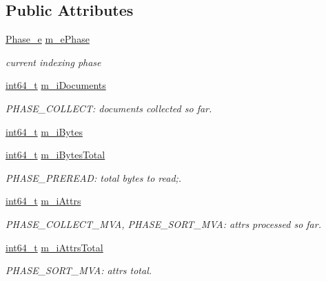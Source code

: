 \subsection*{Public Attributes}
\begin{DoxyCompactItemize}
\item 
\hyperlink{structCSphIndexProgress_a9cb9d88169df8a08b63f58ac952f97e2}{Phase\-\_\-e} \hyperlink{structCSphIndexProgress_acf27cb1ca0bc036494f1e798bdb97483}{m\-\_\-e\-Phase}
\begin{DoxyCompactList}\small\item\em current indexing phase \end{DoxyCompactList}\item 
\hyperlink{sphinxstd_8h_a996e72f71b11a5bb8b3b7b6936b1516d}{int64\-\_\-t} \hyperlink{structCSphIndexProgress_aa3fdf708687fd27e13bae4f384f605f0}{m\-\_\-i\-Documents}
\begin{DoxyCompactList}\small\item\em P\-H\-A\-S\-E\-\_\-\-C\-O\-L\-L\-E\-C\-T\-: documents collected so far. \end{DoxyCompactList}\item 
\hyperlink{sphinxstd_8h_a996e72f71b11a5bb8b3b7b6936b1516d}{int64\-\_\-t} \hyperlink{structCSphIndexProgress_a778f740e2ce2fa762b042bdb3ae06cbc}{m\-\_\-i\-Bytes}
\item 
\hyperlink{sphinxstd_8h_a996e72f71b11a5bb8b3b7b6936b1516d}{int64\-\_\-t} \hyperlink{structCSphIndexProgress_a3f89e51e9c2238eec970ba7de63ba33d}{m\-\_\-i\-Bytes\-Total}
\begin{DoxyCompactList}\small\item\em P\-H\-A\-S\-E\-\_\-\-P\-R\-E\-R\-E\-A\-D\-: total bytes to read;. \end{DoxyCompactList}\item 
\hyperlink{sphinxstd_8h_a996e72f71b11a5bb8b3b7b6936b1516d}{int64\-\_\-t} \hyperlink{structCSphIndexProgress_a0ece283c0e0643c6dbc9c16d27cd2b5d}{m\-\_\-i\-Attrs}
\begin{DoxyCompactList}\small\item\em P\-H\-A\-S\-E\-\_\-\-C\-O\-L\-L\-E\-C\-T\-\_\-\-M\-V\-A, P\-H\-A\-S\-E\-\_\-\-S\-O\-R\-T\-\_\-\-M\-V\-A\-: attrs processed so far. \end{DoxyCompactList}\item 
\hyperlink{sphinxstd_8h_a996e72f71b11a5bb8b3b7b6936b1516d}{int64\-\_\-t} \hyperlink{structCSphIndexProgress_a4669529ab4d9ae7ccae6554614eda98b}{m\-\_\-i\-Attrs\-Total}
\begin{DoxyCompactList}\small\item\em P\-H\-A\-S\-E\-\_\-\-S\-O\-R\-T\-\_\-\-M\-V\-A\-: attrs total. \end{DoxyCompactList}\item 

\end{DoxyCompactItemize}
